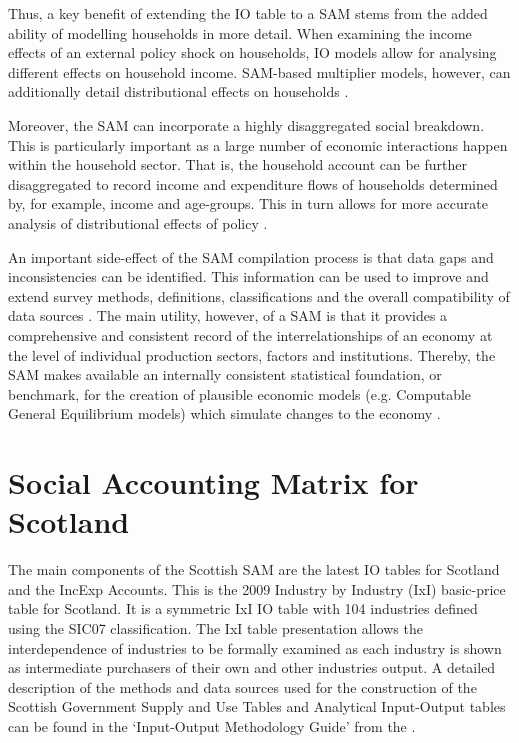 \bigskip 

Thus, a key benefit of extending the IO table to a SAM stems from the added ability of modelling households in more detail. When examining the income effects of an external policy shock on households, IO models allow for analysing different effects on household income. SAM-based multiplier models, however, can additionally detail distributional effects on households \cite{Round2003a}.

\bigskip

Moreover, the SAM can incorporate a highly disaggregated social breakdown. This is particularly important as a large number of economic interactions happen within the household sector. That is, the household account can be further disaggregated to record income and expenditure flows of households determined by, for example, income and age-groups. This in turn allows for more accurate analysis of distributional effects of policy \cite{Stuttard2003b}.

\bigskip

An important side-effect of the SAM compilation process is that data gaps and inconsistencies can be identified. This information can be used to improve and extend survey methods, definitions, classifications and the overall compatibility of data sources \cite{Keuning1988a}. The main utility, however, of a SAM is that it provides a comprehensive and consistent record of the interrelationships of an economy at the level of individual production sectors, factors and institutions. Thereby, the SAM makes available an internally consistent statistical foundation, or benchmark, for the creation of plausible economic models (e.g. Computable General Equilibrium models) which simulate changes to the economy \cite{Reinert1997a}.

\newpage
\section{Social Accounting Matrix for Scotland} \label{sec:2.3}

The main components of the Scottish SAM are the latest IO tables for Scotland \cite{ScottishGovernment2013a} and the IncExp Accounts. This is the 2009 Industry by Industry (IxI) basic-price table for Scotland. It is a symmetric IxI IO table with 104 industries defined using the SIC07 classification. The IxI table presentation allows the interdependence of industries to be formally examined as each industry is shown as intermediate purchasers of their own and other industries output. A detailed description of the methods and data sources used for the construction of the Scottish Government Supply and Use Tables and Analytical Input-Output tables can be found in the `Input-Output Methodology Guide' from the .

